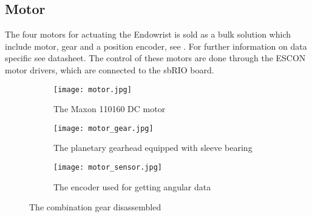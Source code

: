\subsection{Motor}\label{Maxon_Motor}
The four motors for actuating the Endowrist is sold as a bulk solution which include motor, gear and a position encoder, see . For further information on data specific see datasheet.
The control of these motors are done through the ESCON motor drivers, which are connected to the sbRIO board.


\begin{figure}[H]
	\centering
	\begin{subfigure}{.32\textwidth}
		\centering
		\texttt{[image: motor.jpg]}
		\caption{The Maxon 110160 DC motor \vspace{8.5mm}   }
		\label{fig:motor}
	\end{subfigure}
	\begin{subfigure}{.32\textwidth}
		\centering
		\texttt{[image: motor\_gear.jpg]}
		\caption{The planetary gearhead equipped with sleeve bearing}
		\label{fig:motor_gear}
	\end{subfigure}
	\begin{subfigure}{.32\textwidth}
		\centering
		\texttt{[image: motor\_sensor.jpg]}
		\caption{The encoder used for getting angular data}
		\label{fig:motor_sensor}
	\end{subfigure}
	\caption{The combination gear disassembled}
	\label{fig:Full_motor _dis}
\end{figure}

